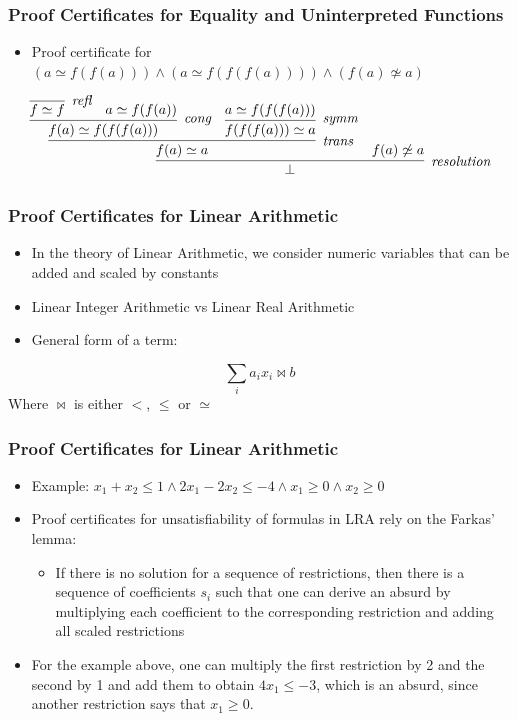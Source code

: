 \documentclass[usepdftitle=false,aspectratio=169,usenames,dvipsnames]{beamer}
\newcommand\vitem{\vfill\item}
\begin{document}
\begin{frame}
  \frametitle{Proof Certificates for Equality and Uninterpreted Functions}
  \begin{itemize}
    \item Proof certificate for $(a \simeq f(f(a))) \wedge (a \simeq f(f(f(a)))) \wedge (f(a) \not\simeq a)$
  \end{itemize}
  \vfill
  \[
    \infer[\textit{resolution}]{\bot}{\infer[\textit{trans}]{f(a) \simeq a}{\infer[\textit{cong}]{f(a) \simeq f(f(f(a)))}{\infer[\textit{refl}]{f \simeq f}{} & a \simeq f(f(a))} & \infer[\textit{symm}]{f(f(f(a))) \simeq a}{a \simeq f(f(f(a)))}} & f(a) \not\simeq a}
  \]
\end{frame}

\begin{frame}
  \frametitle{Proof Certificates for Linear Arithmetic}
  \begin{itemize}
    \item In the theory of Linear Arithmetic, we consider numeric variables that can be added and scaled by constants
    \vitem Linear Integer Arithmetic vs Linear Real Arithmetic
    \vitem General form of a term:
  \end{itemize}
  \[
    \sum_{i} a_{i} x_{i} \bowtie b
  \]
  Where $\bowtie$ is either $<$, $\le$ or $\simeq$
\end{frame}

\begin{frame}
  \frametitle{Proof Certificates for Linear Arithmetic}
  \begin{itemize}
    \item Example: $x_{1} + x_{2} \le 1 \wedge 2x_{1} - 2x_{2} \le -4 \wedge x_{1} \ge 0 \wedge x_{2} \ge 0$
    \vitem Proof certificates for unsatisfiability of formulas in LRA rely on the Farkas' lemma:
    \begin{itemize}
      \item If there is no solution for a sequence of restrictions, then there is a sequence of coefficients $s_{i}$ such that one can derive an absurd by multiplying each coefficient to the corresponding restriction and adding all scaled restrictions
    \end{itemize}
    \vitem For the example above, one can multiply the first restriction by 2 and the second by 1 and add them to obtain $4x_{1} \le -3$, which is an absurd, since another restriction says that $x_{1} \ge 0$.
  \end{itemize}
\end{frame}
\end{document}
